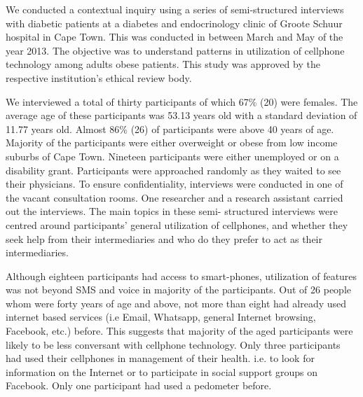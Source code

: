 \documentclass{sig-alternate}
\begin{document}
We conducted a contextual inquiry using a series of semi-structured interviews
with diabetic patients at a diabetes and endocrinology clinic of Groote Schuur
hospital in Cape Town. This was conducted in between March and May of the year
2013. The objective was to understand patterns in utilization of cellphone
technology among adults obese patients. This study was approved by the
respective institution's ethical review body.

We interviewed a total of thirty participants of which 67\% (20) were
females.  The average age of these participants was 53.13 years old with a
standard deviation of 11.77 years old.  Almost 86\% (26) of participants were
above 40 years of age. Majority of the participants were either overweight or
obese from low income suburbs of Cape Town. Nineteen participants were either
unemployed or on a disability grant. Participants were approached randomly as
they waited to see their physicians. To ensure confidentiality, interviews
were conducted in one of the vacant consultation rooms. One researcher and a
research assistant carried out the interviews. The main topics in these semi-
structured interviews were centred around participants' general utilization of
cellphones, and whether they seek help from their intermediaries and who do
they prefer to act as their intermediaries.

Although eighteen participants had access to smart-phones, utilization of
features was not beyond SMS and voice in majority of the participants. Out of
26 people whom were forty years of age and above, not more than eight had
already used internet based services (i.e Email, Whatsapp, general Internet
browsing, Facebook, etc.) before. This suggests that majority of the aged
participants were likely to be less conversant with cellphone technology. Only
three participants had used their cellphones in management of their health.
i.e. to look for information on the Internet or to participate in social
support groups on Facebook. Only one participant had used a pedometer before.
\end{document}
